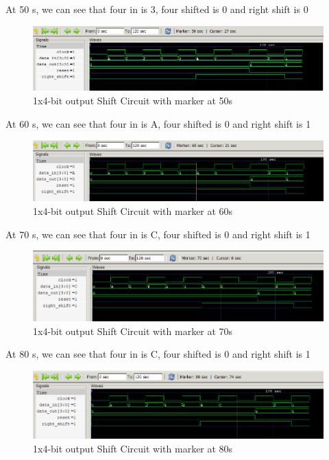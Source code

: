 \documentclass[12pt]{article}
\begin{document}
\newpage

At 50 s, we can see that four in is 3, four shifted is 0 and right shift is 0
\begin{figure}[h]
    \centering
    \includegraphics[width = 1.0\textwidth]{figs/Shift50.png}
    \caption{1x4-bit output Shift Circuit with marker at 50s}
    \label{fig:enter-label}
\end{figure}

At 60 s, we can see that four in is A, four shifted is 0 and right shift is 1
\begin{figure}[h]
    \centering
    \includegraphics[width = 1.0\textwidth]{figs/Shift60.png}
    \caption{1x4-bit output Shift Circuit with marker at 60s}
    \label{fig:enter-label}
\end{figure}

At 70 s, we can see that four in is C, four shifted is 0 and right shift is 1
\begin{figure}[h]
    \centering
    \includegraphics[width = 1.0\textwidth]{figs/Shift70.png}
    \caption{1x4-bit output Shift Circuit with marker at 70s}
    \label{fig:enter-label}
\end{figure}

\newpage

At 80 s, we can see that four in is C, four shifted is 0 and right shift is 1
\begin{figure}[h]
    \centering
    \includegraphics[width = 1.0\textwidth]{figs/Shift80.png}
    \caption{1x4-bit output Shift Circuit with marker at 80s}
    \label{fig:enter-label}
\end{figure}
\end{document}
